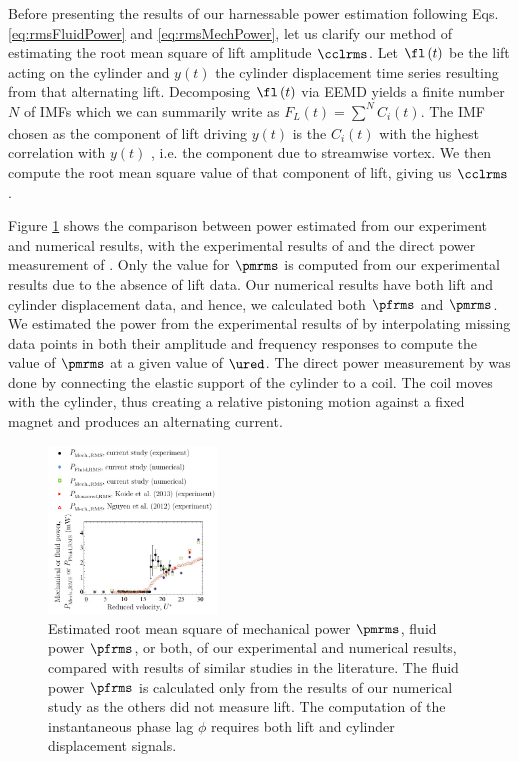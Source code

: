 \documentclass[a4paper,fleqn]{cas-sc}
\begin{document}
Before presenting the results of our harnessable power estimation following Eqs. \ref{eq:rmsFluidPower} and \ref{eq:rmsMechPower}, let us clarify our method of estimating the root mean square of lift amplitude $\cclrms$. Let $\fl\left( t \right)$ be the lift acting on the cylinder and $y\left( t \right)$ the cylinder displacement time series resulting from that alternating lift. Decomposing $\fl\left( t \right)$ via EEMD yields a finite number $N$ of IMFs which we can summarily write as $F_{L} \left( t \right) = \sum\limits_{}^{N}C_{i} \left( t \right) $. The IMF chosen as the component of lift driving $y \left( t \right) $  is the $C_{i} \left( t \right) $  with the highest correlation with  $ y \left( t \right)  $ , i.e. the component due to streamwise vortex. We then compute the root mean square value of that component of lift, giving us $\cclrms$.

Figure \ref{fig:powerComparison} shows the comparison between power estimated from our experiment and numerical results, with the experimental results of \citet{Nguyen2012} and the direct power measurement of \citet{Koide2013}. Only the value for $\pmrms$ is computed from our experimental results due to the absence of lift data. Our numerical results have both lift and cylinder displacement data, and hence, we calculated both $\pfrms$ and $\pmrms$. We estimated the power from the experimental results of \citet{Nguyen2012} by interpolating missing data points in both their amplitude and frequency responses to compute the value of $\pmrms$ at a given value of $\ured$. The direct power measurement by \citet{Koide2013} was done by connecting the elastic support of the cylinder to a coil. The coil moves with the cylinder, thus creating a relative pistoning motion against a fixed magnet and produces an alternating current.

\begin{figure}
  \centering
  \includegraphics[width=0.4\textwidth]{figs/figure20}
  \caption{Estimated root mean square of mechanical power $\pmrms$, fluid power $\pfrms$, or both, of our experimental and numerical results, compared with results of similar studies in the literature. The fluid power $\pfrms$ is calculated only from the results of our numerical study as the others did not measure lift. The computation of the instantaneous phase lag $\phi$ requires both lift and cylinder displacement signals.}
  \label{fig:powerComparison}
\end{figure}
\end{document}
